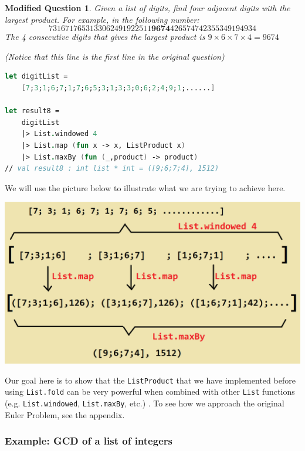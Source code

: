 \documentclass[12pt]{article}
\newtheorem*{modQuestion*}{Modified Question}
\begin{document}
\begin{modQuestion*}
Given a list of digits, find four adjacent digits with the largest product. For example, in the following number:
\[
7316717653133062491922511\mathbf{9674}426574742355349194934
\]
The 4 consecutive digits that gives the largest product is $9 \times 6 \times 7 \times 4 = 9674$

(Notice that this line is the first line in the original question)
\end{modQuestion*}
\begin{lstlisting}[language=FSharp]
let digitList = 
    [7;3;1;6;7;1;7;6;5;3;1;3;3;0;6;2;4;9;1;......]

let result8 =
    digitList
    |> List.windowed 4
    |> List.map (fun x -> x, ListProduct x)
    |> List.maxBy (fun (_,product) -> product)
// val result8 : int list * int = ([9;6;7;4], 1512)
\end{lstlisting}
We will use the picture below to illustrate what we are trying to achieve here.
\begin{center}
\includegraphics[width=\textwidth]{pictures/picture35.png}
\end{center}

Our goal here is to show that the \texttt{ListProduct} that we have implemented before using \texttt{List.fold} can be very powerful when combined with other \texttt{List} functions (e.g. \texttt{List.windowed}, \texttt{List.maxBy}, etc.) . To see how we approach the original Euler Problem, see the appendix. 
\pagebreak

\subsubsection*{Example: GCD of a list of integers}
\end{document}
